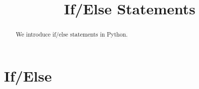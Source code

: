 \documentclass{ximera}
\title{If/Else Statements}
\begin{document}
  
\begin{abstract}  
We introduce if/else statements in Python.
\end{abstract}  
\maketitle

\section{If/Else}




\begin{problem}
\end{problem}

\begin{problem}
\end{problem}
\end{document}
